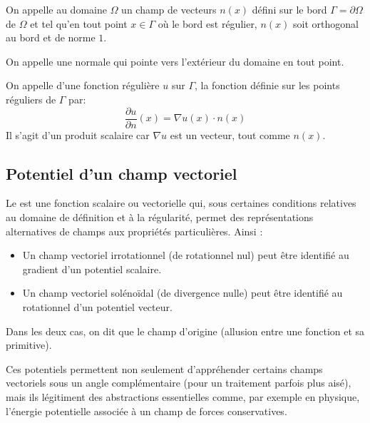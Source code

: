 \begin{definition}[Normale]
On appelle  au domaine $\Omega$ un champ de vecteurs
$n(x)$ défini sur le bord $\Gamma=\partial\Omega$ de $\Omega$ et tel qu'en tout point
$x\in\Gamma$ où le bord est régulier, $n(x)$ soit orthogonal au bord
et de norme $1$.
\end{definition}

\medskip
On appelle  une normale qui pointe vers
l'extérieur du domaine en tout point.

\medskip
\begin{definition}
On appelle  d'une fonction régulière $u$
sur $\Gamma$, la fonction définie sur les points réguliers de $\Gamma$ par:
\begin{equation}\dfrac{\partial u}{\partial n}(x)=\nabla u(x)\cdot n(x)\end{equation} Il s'agit d'un produit
scalaire car $\nabla u$ est un vecteur, tout comme $n(x)$.
\end{definition}

\medskip
\subsection{Potentiel d'un champ vectoriel}

Le  est une fonction scalaire ou vectorielle qui,
sous certaines conditions relatives au domaine de définition et à la régularité,
permet des représentations alternatives de champs aux propriétés particulières.
Ainsi :
\begin{itemize}
   \item Un champ vectoriel irrotationnel (de rotationnel nul) peut être identifié au gradient d'un potentiel scalaire.
   \item Un champ vectoriel solénoïdal (de divergence nulle) peut être identifié au rotationnel d'un potentiel vecteur.
\end{itemize}
Dans les deux cas, on dit que le champ d'origine 
(allusion entre une fonction et sa primitive).

\medskip
Ces potentiels permettent non seulement d'appréhender certains champs vectoriels sous un angle
complémentaire (pour un traitement parfois plus aisé), mais ils légitiment des abstractions essentielles
comme, par exemple en physique, l'énergie potentielle associée à un champ de forces conservatives.

